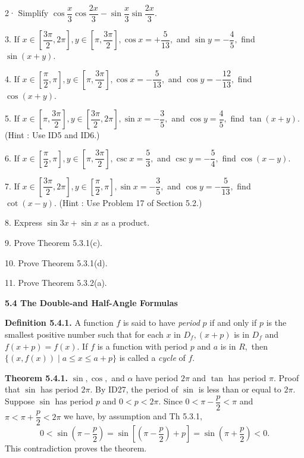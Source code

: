 2· Simplify $\cos \dfrac{x}{3} \cos \dfrac{2x}{3} - \sin \dfrac{x}{3} \sin \dfrac{2x}{3}.$\nl

\newpage
3.  If $x\in \left[ \dfrac{3\pi}{2}, 2\pi \right], y\in \left[\pi, \dfrac{3\pi}{2}\right] , \cos x = +\dfrac{5}{13},$ and $\sin y = - \dfrac{4}{5},$ find $\sin (x + y).$\nl

4.  If $x\in \left[ \dfrac{\pi}{2}, \pi \right], y\in \left[\pi, \dfrac{3\pi}{2}\right] , \cos x = -\dfrac{5}{13},$ and $\cos y = - \dfrac{12}{13},$ find $\cos (x + y).$\nl

5.  If $x\in \left[ \pi, \dfrac{3\pi}{2} \right], y\in \left[\dfrac{3\pi}{2}, 2\pi \right] , \sin x = -\dfrac{3}{5},$ and $\cos y = \dfrac{4}{5},$ find $\tan (x + y).$\nl
(Hint : Use ID5 and ID6.)\nl

6.  If $x\in \left[ \dfrac{\pi}{2}, \pi \right], y\in \left[\pi, \dfrac{3\pi}{2}\right] , \csc x = \dfrac{5}{3},$ and $\csc y = - \dfrac{5}{4},$ find $\cos (x - y).$\nl

7.  If $x\in \left[ \dfrac{3\pi}{2}, 2\pi \right], y\in \left[\dfrac{\pi}{2}, \pi \right] , \sin x = -\dfrac{3}{5},$ and $\cos y = - \dfrac{5}{13},$ find $\cot (x - y).$\nl
(Hint : Use Problem 17 of Section 5.2.)\nl

8. Express $\sin 3x + \sin x$ as a product.\nl

9. Prove Theorem 5.3.1(c).\nl

10. Prove Theorem 5.3.1(d).\nl

11. Prove Theorem 5.3.2(a).\nl
\vfill

\textbf{5.4 The Double-and Half-Angle Formulas} \nl

\textbf{Definition 5.4.1.} A function $f$ is said to have \textit{period} $p$ if and only if $p$ is the smallest positive number such that for each $x$ in $D_{f}, (x + p)$ is in $D_{f}$ and $f(x + p) =f(x).$ If $f$ is a function with period $p$ and $a$ is in $R,$ then $\{(x,f(x)) \mid a \leq x \leq a + p\}$ is called a \textit{cycle} of $f.$\nl

\textbf{Theorem 5.4.1.} $\sin, \cos,$ and $\alpha$ have period $2\pi$ and $\tan$ has period $\pi.$\nl
Proof that $\sin$ has period $2\pi.$ By ID27, the period of $\sin$ is less than or equal to $2\pi.$ Suppose $\sin$ has period $p$ and $0< p <2\pi.$ Since $0 <\pi - \dfrac{p}{2} < \pi$ and $\pi < \pi + \dfrac{p}{2} <2\pi$ we have, by assumption and Th 5.3.1,
\[
0< \sin\left(\pi - \dfrac{p}{2}\right) = \sin \left[\left(\pi - \dfrac{p}{2}\right) + p \right] = \sin\left( \pi + \dfrac{p}{2}\right) < 0.
\]
This contradiction proves the theorem.
\newpage

